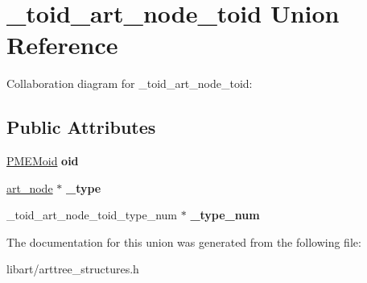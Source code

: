 \hypertarget{union__toid__art__node__toid}{}\section{\+\_\+toid\+\_\+art\+\_\+node\+\_\+toid Union Reference}
\label{union__toid__art__node__toid}


Collaboration diagram for \+\_\+toid\+\_\+art\+\_\+node\+\_\+toid\+:
\subsection*{Public Attributes}
\begin{DoxyCompactItemize}
\item 
\mbox{\label{union__toid__art__node__toid_af3026cc97b4fe7114534e1e6c0896daf}} 
\hyperlink{structpmemoid}{P\+M\+E\+Moid} {\bfseries oid}
\item 
\mbox{\label{union__toid__art__node__toid_ad6bd05d91d8c56112ce388d405d618ca}} 
\hyperlink{struct__art__node}{art\+\_\+node} $\ast$ {\bfseries \+\_\+type}
\item 
\mbox{\label{union__toid__art__node__toid_af8584f1221c5eda9977a7f1ebbe919ad}} 
\+\_\+toid\+\_\+art\+\_\+node\+\_\+toid\+\_\+type\+\_\+num $\ast$ {\bfseries \+\_\+type\+\_\+num}
\end{DoxyCompactItemize}


The documentation for this union was generated from the following file\+:\begin{DoxyCompactItemize}
\item 
libart/arttree\+\_\+structures.\+h\end{DoxyCompactItemize}
